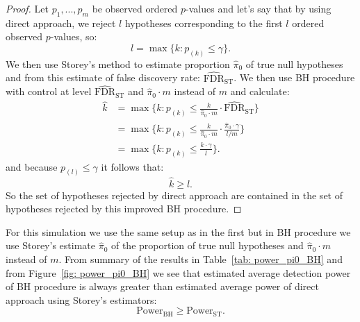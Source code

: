 \documentclass[10pt]{article}
\begin{document}
\begin{proof}
Let $p_{1}, ..., p_{m}$ be observed ordered $p$-values and let's say that by using direct approach, we reject $l$ hypotheses corresponding to the first $l$ ordered observed $p$-values, so:
\begin{equation}
	l = \max \lbrace k : p_{(k)} \leq \gamma \rbrace.
\end{equation}
We then use Storey's method to estimate proportion $\widehat{\pi}_{0}$ of true null hypotheses and from this estimate of false discovery rate: $\widehat{\text{FDR}}_{\text{ST}}$. We then use BH procedure with control at level $\widehat{\text{FDR}}_{\text{ST}}$ and $\widehat{\pi}_{0} \cdot m$ instead of $m$ and calculate:
\begin{align}
	\hat{k} 
	&=\max \lbrace k : p_{(k)} \leq \frac{k}{\widehat{\pi}_{0} \cdot m} \cdot \widehat{\text{FDR}}_{\text{ST}} \rbrace \\
	&=\max \lbrace k : p_{(k)} \leq \frac{k}{\widehat{\pi}_{0} \cdot m} \cdot \frac{\widehat{\pi}_{0} \cdot \gamma}{l / m} \rbrace \\
	&=\max \lbrace k : p_{(k)} \leq \frac{k \cdot \gamma}{l} \rbrace.	
\end{align}
and because $p_{(l)} \leq \gamma$ it follows that:
\begin{equation}
	\hat{k} \geq l.
\end{equation}
So the set of hypotheses rejected by direct approach are contained in the set of hypotheses rejected by this improved BH procedure. 
\end{proof}

For this simulation we use the same setup as in the first but in BH procedure we use Storey's estimate $\widehat{\pi}_{0}$ of the proportion of true null hypotheses and $\widehat{\pi}_{0} \cdot m$ instead of $m$. From summary of the results in Table~\ref{tab: power_pi0_BH} and from Figure~\ref{fig: power_pi0_BH} we see that estimated average detection power of BH procedure is always greater than estimated average power of direct approach using Storey's estimators:
\begin{equation}
	\text{Power}_{\text{BH}} \geq \text{Power}_{\text{ST}}.
\end{equation}
\end{document}
